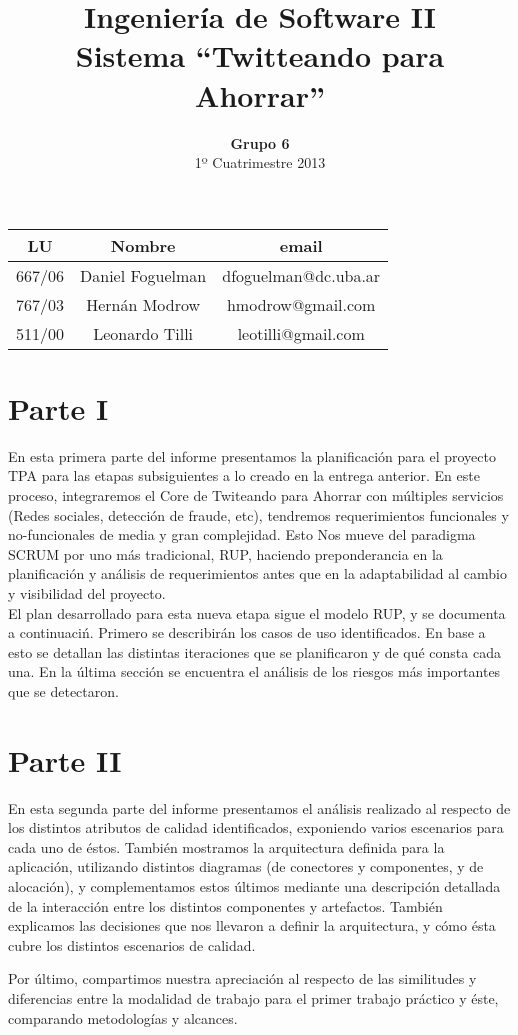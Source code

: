 \documentclass[a4paper,spanish]{article}
\title{Ingenier\'ia de Software II\\ \textbf{Sistema ``Twitteando para Ahorrar''}}
\author{\textbf{Grupo 6}\\ 1º Cuatrimestre 2013}
\date{}
\begin{document}
\maketitle
\vspace{10cm}
\begin{center}

\begin{tabular}{|c|c|c|}
\hline
\hline
\textbf{LU}&\textbf{Nombre}&\textbf{email}\\
\hline
667/06&Daniel Foguelman &dfoguelman@dc.uba.ar\\
\hline
767/03&Hern\'an Modrow&hmodrow@gmail.com\\
\hline
511/00&Leonardo Tilli&leotilli@gmail.com\\
\hline
\hline
\end{tabular}
\end{center}
\newpage

\section{Parte I}

 En esta primera parte del informe presentamos la planificaci\'on para el proyecto TPA para las etapas subsiguientes a lo creado en la entrega anterior. En este proceso, integraremos el Core de Twiteando para Ahorrar con m\'ultiples servicios (Redes sociales, detecci\'on de fraude, etc), tendremos requerimientos funcionales y no-funcionales de media y gran complejidad. Esto Nos mueve del paradigma SCRUM por uno m\'as tradicional, RUP, haciendo preponderancia en la planificaci\'on y an\'alisis de requerimientos antes que en la adaptabilidad al cambio y visibilidad del proyecto. \\

 El plan desarrollado para esta nueva etapa sigue el modelo RUP, y se documenta a continuaci\'n. Primero se describir\'an los casos de uso identificados. En base a esto se detallan las distintas iteraciones que se planificaron y de qu\'e consta cada una. En la \'ultima secci\'on se encuentra el an\'alisis de los riesgos m\'as importantes que se detectaron.






\section{Parte II}

 En esta segunda parte del informe presentamos el an\'alisis realizado al respecto de los distintos atributos de calidad identificados, exponiendo varios escenarios para cada uno de \'estos. Tambi\'en mostramos la arquitectura definida para la aplicaci\'on, utilizando distintos diagramas (de conectores y componentes, y de alocaci\'on), y complementamos estos \'ultimos mediante una descripci\'on detallada de la interacci\'on entre los distintos componentes y artefactos. Tambi\'en explicamos las decisiones que nos llevaron a definir la arquitectura, y c\'omo \'esta cubre los distintos escenarios de calidad.
 
 Por \'ultimo, compartimos nuestra apreciaci\'on al respecto de las similitudes y diferencias entre la modalidad de trabajo para el primer trabajo pr\'actico y \'este, comparando metodolog\'ias y alcances.
 




\end{document}
